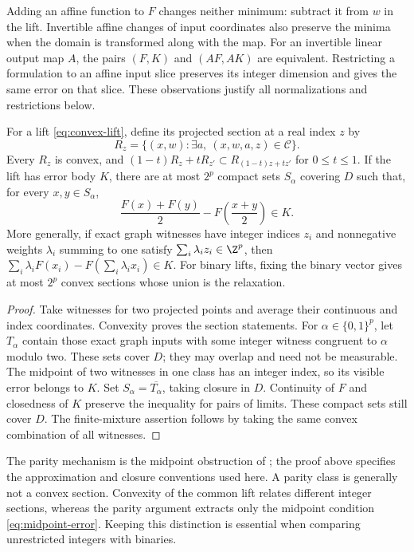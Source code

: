 Adding an affine function to $F$ changes neither minimum: subtract it
from $w$ in the lift. Invertible affine changes of input coordinates also
preserve the minima when the domain is transformed along with the map.
For an invertible linear output map $A$, the pairs $(F,K)$ and $(AF,AK)$
are equivalent. Restricting a formulation to an affine input slice
preserves its integer dimension and gives the same error on that slice.
These observations justify all normalizations and restrictions below.

\begin{lemma}\label{lem:parity}
For a lift \eqref{eq:convex-lift}, define its projected section at a
real index $z$ by
\[
 R_z=\{(x,w):\exists a,\ (x,w,a,z)\in\mathcal C\}.
\]
Every $R_z$ is convex, and
$(1-t)R_z+tR_{z'}\subset R_{(1-t)z+tz'}$ for $0\le t\le1$.
If the lift has error body $K$, there are at most $2^p$ compact sets
$S_\alpha$ covering $D$ such that, for every $x,y\in S_\alpha$,
\begin{equation}\label{eq:midpoint-error}
 \frac{F(x)+F(y)}2-F\left(\frac{x+y}2\right)\in K.
\end{equation}
More generally, if exact graph witnesses have integer indices $z_i$ and
nonnegative weights $\lambda_i$ summing to one satisfy
$\sum_i\lambda_i z_i\in\Z^p$, then
$\sum_i\lambda_iF(x_i)-F(\sum_i\lambda_i x_i)\in K$.
For binary lifts, fixing the binary vector gives at most $2^p$ convex
sections whose union is the relaxation.
\end{lemma}
\begin{proof}
Take witnesses for two projected points and average their continuous and
index coordinates. Convexity proves the section statements. For
$\alpha\in\{0,1\}^p$, let $T_\alpha$ contain those exact graph inputs
with some integer witness congruent to $\alpha$ modulo two. These sets
cover $D$; they may overlap and need not be measurable. The midpoint of
two witnesses in one class has an integer index, so its visible error
belongs to $K$. Set $S_\alpha=\overline{T_\alpha}$, taking closure in
$D$. Continuity of $F$ and closedness of $K$ preserve the inequality
for pairs of limits. These compact sets still cover $D$. The finite-mixture assertion follows
by taking the same convex combination of all witnesses.
\end{proof}

The parity mechanism is the midpoint obstruction of
\citet[Lemma 4.1]{lubin2022}; the proof above specifies the approximation
and closure conventions used here. A parity class is generally not a
convex section. Convexity of the common lift relates different integer
sections, whereas the parity argument extracts only the midpoint
condition \eqref{eq:midpoint-error}. Keeping this distinction is essential
when comparing unrestricted integers with binaries.


